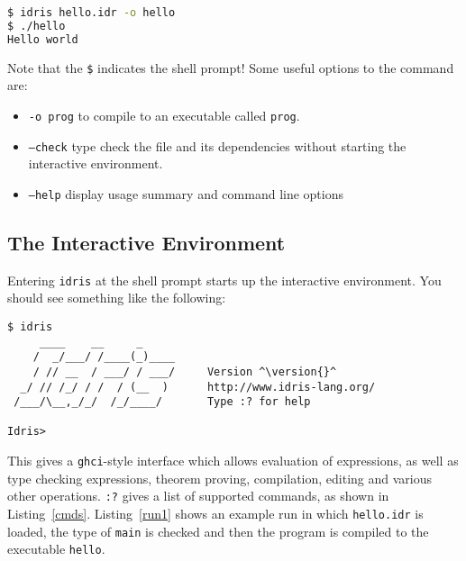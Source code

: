 \begin{lstlisting}[language=bash]
$ idris hello.idr -o hello
$ ./hello
Hello world
\end{lstlisting}

\noindent
Note that the \texttt{\$} indicates the shell prompt! Some useful options to the \Idris{} command are:

\begin{itemize}
\item \texttt{-o prog} to compile to an executable called \texttt{prog}.
\item \texttt{--check} type check the file and its dependencies without starting the 
interactive environment.
\item \texttt{--help} display usage summary and command line options
\end{itemize}

\subsection{The Interactive Environment}

Entering \texttt{idris} at the shell prompt starts up the interactive environment.
You should see something like the following:

\begin{lstlisting}[escapechar=^]
$ idris
     ____    __     _                                          
    /  _/___/ /____(_)____                                     
    / // __  / ___/ / ___/     Version ^\version{}^
  _/ // /_/ / /  / (__  )      http://www.idris-lang.org/      
 /___/\__,_/_/  /_/____/       Type :? for help      

Idris>
\end{lstlisting}

\noindent
This gives a \texttt{ghci}-style interface which allows evaluation of expressions, as well as type checking expressions, theorem proving, compilation, editing and various other operations. \texttt{:?} gives a list of supported commands, as shown in Listing~\ref{cmds}.
Listing~\ref{run1} shows an example run in which \texttt{hello.idr} is loaded, the type of \texttt{main} is checked and then the program is compiled to the executable \texttt{hello}.

